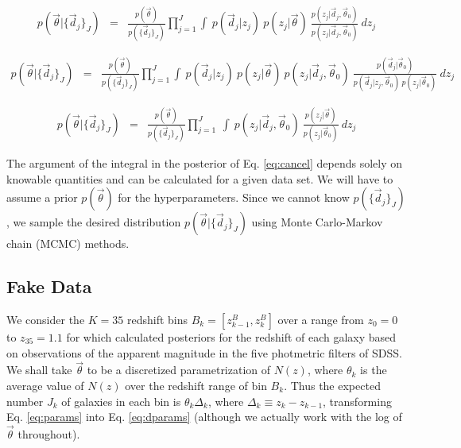 \documentclass[12pt, onecolumn]{emulateapj}
\begin{document}
\begin{eqnarray}
\label{eq:trick}
p(\vec{\theta}|\{\vec{d}_{j}\}_{J}) &=& \frac{p(\vec{\theta})}{p(\{\vec{d}_{j}\}_{J})}\prod_{j=1}^{J}\int\ p(\vec{d}_{j}|z_{j})\ p(z_{j}|\vec{\theta})\ \frac{p(z_{j}|\vec{d}_{j},\vec{\theta}_{0})}{p(z_{j}|\vec{d}_{j},\vec{\theta}_{0})}\ dz_{j}
\end{eqnarray}

\begin{eqnarray}
\label{eq:expand}
p(\vec{\theta}|\{\vec{d}_{j}\}_{J}) &=& \frac{p(\vec{\theta})}{p(\{\vec{d}_{j}\}_{J})}\prod_{j=1}^{J}\int\ p(\vec{d}_{j}|z_{j})\ p(z_{j}|\vec{\theta})\ p(z_{j}|\vec{d}_{j},\vec{\theta}_{0})\ \frac{p(\vec{d}_{j}|\vec{\theta}_{0})}{p(\vec{d}_{j}|z_{j},\vec{\theta}_{0})\ p(z_{j}|\vec{\theta}_{0})}\ dz_{j}
\end{eqnarray}

\begin{eqnarray}
\label{eq:cancel}
p(\vec{\theta}|\{\vec{d}_{j}\}_{J}) &=& \frac{p(\vec{\theta})}{p(\{\vec{d}_{j}\}_{J})}\prod_{j=1}^{J}\ \int\ p(z_{j}|\vec{d}_{j},\vec{\theta}_{0})\ \frac{p(z_{j}|\vec{\theta})}{p(z_{j}|\vec{\theta}_{0})}\ dz_{j}
\end{eqnarray}

The argument of the integral in the posterior of Eq. \ref{eq:cancel} depends solely on knowable quantities and can be calculated for a given data set.  We will have to assume a prior $p(\vec{\theta})$ for the hyperparameters.   Since we cannot know $p(\{\vec{d}_{j}\}_{J})$, we sample the desired distribution $p(\vec{\theta}|\{\vec{d}_{j}\}_{J})$ using Monte Carlo-Markov chain (MCMC) methods.  

\subsection{Fake Data}
\label{sec:fake}

We consider the $K=35$ redshift bins $B_{k}=[z^{B}_{k-1},z^{B}_{k}]$ over a range from $z_{0}=0$ to $z_{35}=1.1$ for which \citet{she11} calculated posteriors for the redshift of each galaxy based on observations of the apparent magnitude in the five photmetric filters of SDSS.  We shall take $\vec{\theta}$ to be a discretized parametrization of $N(z)$, where $\theta_{k}$ is the average value of $N(z)$ over the redshift range of bin $B_{k}$.   Thus the expected number $J_{k}$ of galaxies in each bin is $\theta_{k}\Delta_{k}$, where $\Delta_{k}\equiv z_{k}-z_{k-1}$, transforming Eq. \ref{eq:params} into Eq. \ref{eq:dparams} (although we actually work with the log of $\vec{\theta}$ throughout).  
\end{document}
